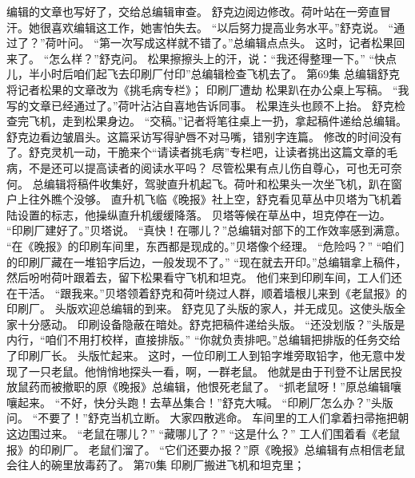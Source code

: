 \documentclass[a4paper,12pt,UTF8,twoside]{ctexbook}
\begin{document}
        编辑的文章也写好了，交给总编辑审查。 
        舒克边阅边修改。荷叶站在一旁直冒汗。她很喜欢编辑这工作，她害怕失去。 
        “以后努力提高业务水平。”舒克说。 
        “通过了？”荷叶问。 
        “第一次写成这样就不错了。”总编辑点点头。 
        这时，记者松果回来了。 
        “怎么样？”舒克问。 
        松果擦擦头上的汗，说：“我还得整理一下。” 
        “快点儿，半小时后咱们起飞去印刷厂付印”总编辑检查飞机去了。   第69集 
        总编辑舒克将记者松果的文章改为《挑毛病专栏》； 
        印刷厂遭劫   
        松果趴在办公桌上写稿。 
        “我写的文章已经通过了。”荷叶沾沾自喜地告诉同事。 
        松果连头也顾不上抬。 
        舒克检查完飞机，走到松果身边。 
        “交稿。”记者将笔往桌上一扔，拿起稿件递给总编辑。 
        舒克边看边皱眉头。这篇采访写得驴唇不对马嘴，错别字连篇。 
        修改的时间没有了。舒克灵机一动，干脆来个“请读者挑毛病”专栏吧，让读者挑出这篇文章的毛病，不是还可以提高读者的阅读水平吗？ 
        尽管松果有点儿伤自尊心，可也无可奈何。 
        总编辑将稿件收集好，驾驶直升机起飞。荷叶和松果头一次坐飞机，趴在窗户上往外瞧个没够。 
        直升机飞临《晚报》社上空，舒克看见草丛中贝塔为飞机着陆设置的标志，他操纵直升机缓缓降落。 
        贝塔等候在草丛中，坦克停在一边。 
        “印刷厂建好了。”贝塔说。 
        “真快！在哪儿？”总编辑对部下的工作效率感到满意。 
        “在《晚报》的印刷车间里，东西都是现成的。”贝塔像个经理。 
        “危险吗？” 
        “咱们的印刷厂藏在一堆铅字后边，一般发现不了。” 
        “现在就去开印。”总编辑拿上稿件，然后吩咐荷叶跟着去，留下松果看守飞机和坦克。 
        他们来到印刷车间，工人们还在干活。 
        “跟我来。”贝塔领着舒克和荷叶绕过人群，顺着墙根儿来到《老鼠报》的印刷厂。 
        头版欢迎总编辑的到来。 
        舒克见了头版的家人，并无成见。这使头版全家十分感动。 
        印刷设备隐蔽在暗处。舒克把稿件递给头版。 
        “还没划版？”头版是内行，“咱们不用打校样，直接排版。” 
        “你就负责排吧。”总编辑把排版的任务交给了印刷厂长。 
        头版忙起来。 
        这时，一位印刷工人到铅字堆旁取铅字，他无意中发现了一只老鼠。他悄悄地探头一看，啊，一群老鼠。 
        他就是由于刊登不让居民投放鼠药而被撤职的原《晚报》总编辑，他恨死老鼠了。 
        “抓老鼠呀！”原总编辑嚷嚷起来。 
        “不好，快分头跑！去草丛集合！”舒克大喊。 
        “印刷厂怎么办？”头版问。 
        “不要了！”舒克当机立断。 
        大家四散逃命。 
        车间里的工人们拿着扫帚拖把朝这边围过来。 
        “老鼠在哪儿？” 
        “藏哪儿了？” 
        “这是什么？” 
        工人们围着看《老鼠报》的印刷厂。 
        老鼠们溜了。 
        “它们还要办报？”原《晚报》总编辑有点相信老鼠会往人的碗里放毒药了。   第70集 
        印刷厂搬进飞机和坦克里； 
\end{document}
